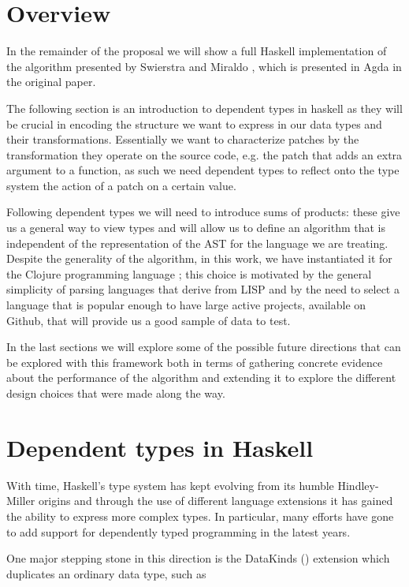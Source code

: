 \documentclass[11pt]{article}
\begin{document}
\section{Overview}\label{overview}
In the remainder of the proposal we will show a full Haskell implementation of the algorithm presented by Swierstra and Miraldo 
\cite{type-directed-diff}, which is presented in Agda in the original paper. 

The following section is an introduction to dependent types in haskell as they will be crucial in encoding 
the structure we want to express in our data types and their transformations. 
Essentially we want to characterize patches by the transformation they operate 
on the source code, e.g. the patch that adds an extra argument to a function, as 
such we need dependent types to reflect onto the type system the action of a 
patch on a certain value.

Following dependent types we will need to introduce sums of products: these give us a general way to view 
types and will allow us to define an algorithm that is independent of the representation of the AST for the language 
we are treating. Despite the generality of the algorithm, in this work, we have 
instantiated it for the Clojure programming language \cite{clojure}; this choice 
is motivated by the general simplicity of parsing languages that derive from 
LISP and by the need to select a language that is popular enough to have large 
active projects, available on Github, that will provide us a good sample of data 
to test.

In the last sections we will explore some of the possible 
future directions that can be explored with this framework both in terms of 
gathering concrete evidence about the performance of the algorithm and extending 
it to explore the different design choices that were made along the way.

\section{Dependent types in
Haskell}\label{dependent-types-in-haskell}

With time, Haskell's type system has kept evolving from its humble
Hindley-Miller origins and through the use of different language extensions it has gained the ability 
to express more complex types. In particular, many efforts have gone to add support for dependently
typed programming in the latest years.

One major stepping stone in this direction is the DataKinds (\cite{datakinds}) extension which duplicates an ordinary data type, such as
\end{document}
